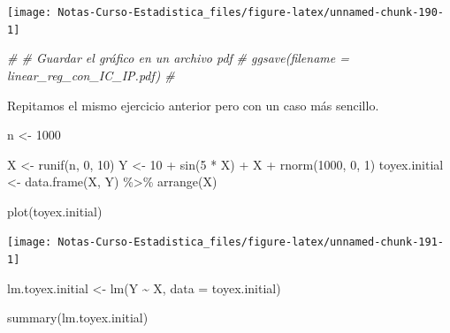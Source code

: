 \documentclass[
  12pt,
]{book}
\newenvironment{Shaded}{\begin{snugshade}}{\end{snugshade}}
\newcommand{\AttributeTok}[1]{\textcolor[rgb]{0.77,0.63,0.00}{#1}}
\newcommand{\CommentTok}[1]{\textcolor[rgb]{0.56,0.35,0.01}{\textit{#1}}}
\newcommand{\DecValTok}[1]{\textcolor[rgb]{0.00,0.00,0.81}{#1}}
\newcommand{\FunctionTok}[1]{\textcolor[rgb]{0.00,0.00,0.00}{#1}}
\newcommand{\NormalTok}[1]{#1}
\newcommand{\OtherTok}[1]{\textcolor[rgb]{0.56,0.35,0.01}{#1}}
\newcommand{\SpecialCharTok}[1]{\textcolor[rgb]{0.00,0.00,0.00}{#1}}
\theoremstyle{definition}
\theoremstyle{definition}
\theoremstyle{definition}
\theoremstyle{remark}
\begin{document}
\begin{center}\texttt{[image: Notas-Curso-Estadistica\_files/figure-latex/unnamed-chunk-190-1]} \end{center}

\begin{Shaded}
\begin{Highlighting}[]
\CommentTok{\# \# Guardar el gráfico en un archivo pdf}
\CommentTok{\# ggsave(filename = \textquotesingle{}linear\_reg\_con\_IC\_IP.pdf\textquotesingle{}) \#}
\end{Highlighting}
\end{Shaded}

Repitamos el mismo ejercicio anterior pero con un caso más sencillo.

\begin{Shaded}
\begin{Highlighting}[]
\NormalTok{n }\OtherTok{\textless{}{-}} \DecValTok{1000}

\NormalTok{X }\OtherTok{\textless{}{-}} \FunctionTok{runif}\NormalTok{(n, }\DecValTok{0}\NormalTok{, }\DecValTok{10}\NormalTok{)}
\NormalTok{Y }\OtherTok{\textless{}{-}} \DecValTok{10} \SpecialCharTok{+} \FunctionTok{sin}\NormalTok{(}\DecValTok{5} \SpecialCharTok{*}\NormalTok{ X) }\SpecialCharTok{+}\NormalTok{ X }\SpecialCharTok{+} \FunctionTok{rnorm}\NormalTok{(}\DecValTok{1000}\NormalTok{, }\DecValTok{0}\NormalTok{, }\DecValTok{1}\NormalTok{)}
\NormalTok{toyex.initial }\OtherTok{\textless{}{-}} \FunctionTok{data.frame}\NormalTok{(X, Y) }\SpecialCharTok{\%\textgreater{}\%} \FunctionTok{arrange}\NormalTok{(X)}

\FunctionTok{plot}\NormalTok{(toyex.initial)}
\end{Highlighting}
\end{Shaded}

\begin{center}\texttt{[image: Notas-Curso-Estadistica\_files/figure-latex/unnamed-chunk-191-1]} \end{center}

\begin{Shaded}
\begin{Highlighting}[]
\NormalTok{lm.toyex.initial }\OtherTok{\textless{}{-}} \FunctionTok{lm}\NormalTok{(Y }\SpecialCharTok{\textasciitilde{}}\NormalTok{ X, }\AttributeTok{data =}\NormalTok{ toyex.initial)}

\FunctionTok{summary}\NormalTok{(lm.toyex.initial)}
\end{Highlighting}
\end{Shaded}
\end{document}

